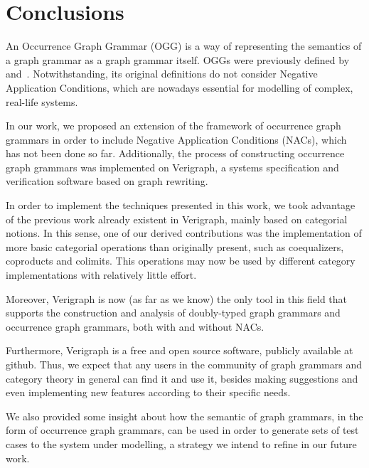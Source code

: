 \chapter{Conclusions}\label{ch:conclusions}

An Occurrence Graph Grammar (OGG) is a way of representing the semantics of a graph grammar as a graph grammar itself. OGGs were previously defined by~\cite{Ribeiro1996} and~\cite{Corradini1996}. Notwithstanding, its original definitions do not consider Negative Application Conditions, which are nowadays essential for modelling of complex, real-life systems.

  In our work, we proposed an extension of the framework of occurrence graph grammars in order to include Negative Application Conditions (NACs), which has not been done so far. Additionally, the process of constructing occurrence graph grammars was implemented on Verigraph, a systems specification and verification software based on graph rewriting.%


In order to implement the techniques presented in this work, we took advantage of the previous work already existent in Verigraph, mainly based on categorial notions. In this sense, one of our derived contributions was the implementation of more basic categorial operations than originally present, such as coequalizers, coproducts and colimits. This operations may now be used by different category implementations with relatively little effort. 

Moreover, Verigraph is now (as far as we know) the only tool in this field that supports the construction and analysis of doubly-typed graph grammars and occurrence graph grammars, both with and without NACs.

    Furthermore, Verigraph is a free and open source software, publicly available at github. Thus, we expect that any users in the community of graph grammars and category theory in general can find it and use it, besides making suggestions and even implementing new features according to their specific needs.

We also provided some insight about how the semantic of graph grammars, in the form of occurrence graph grammars, can be used in order to generate sets of test cases to the system under modelling, a strategy we intend to refine in our future work.

